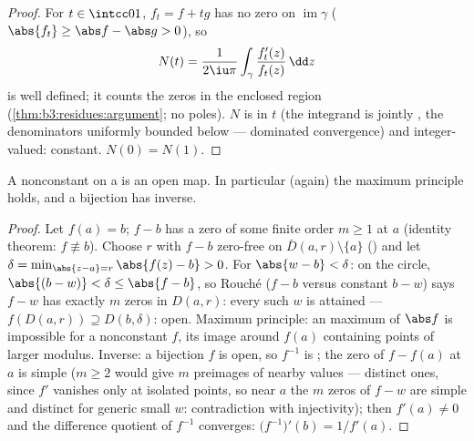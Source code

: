 \begin{proof}
For $t \in \intcc01$, $f_t = f + tg$ has no zero on
$\operatorname{im}\gamma$ ($\abs{f_t} \geq \abs f - \abs g >
0$), so
\[
N(t) = \frac1{2\iu\pi}\int_\gamma
\frac{f_t'(z)}{f_t(z)}\,\dd z
\]
is well defined; it counts the zeros in the enclosed region
(\cref{thm:b3:residues:argument}; no poles). $N$ is
 in $t$ (the integrand is jointly , the
denominators uniformly bounded below --- dominated
convergence) and integer-valued: constant. $N(0) = N(1)$.
\end{proof}

\begin{corollary}
\label{cor:b3:residues:openmapping}
A nonconstant  on a   is
an open map. In particular (again) the maximum principle
holds, and a  bijection has 
inverse.
\end{corollary}

\begin{proof}
Let $f(a) = b$; $f - b$ has a zero of some finite order $m
\geq 1$ at $a$ (identity theorem: $f \not\equiv b$). Choose
$r$ with $f - b$ zero-free on $\bar D(a, r)\setminus\{a\}$
() and let $\delta = \min_{\abs{z - a} =
r}\abs{f(z) - b} > 0$. For $\abs{w - b} < \delta$: on the
circle, $\abs{(b - w)} < \delta \leq \abs{f - b}$, so
Rouch\'e ($f - b$ versus constant $b - w$) says $f - w$ has
exactly $m$ zeros in $D(a, r)$: every such $w$ is attained
--- $f(D(a,r)) \supseteq D(b, \delta)$: open. Maximum
principle: an  maximum of $\abs f$ is impossible for
a nonconstant $f$, its image around $f(a)$ containing points
of larger modulus. Inverse: a  bijection $f$ is
open, so $f^{-1}$ is ; the zero of $f - f(a)$ at
$a$ is simple ($m \geq 2$ would give $m$ preimages of nearby
values --- distinct ones, since $f'$ vanishes only at
isolated points, so near $a$ the $m$ zeros of $f - w$ are
simple and distinct for generic small $w$: contradiction
with injectivity); then $f'(a) \neq 0$ and the difference
quotient of $f^{-1}$ converges: $\bigl(f^{-1}\bigr)'(b) =
1/f'(a)$.
\end{proof}

